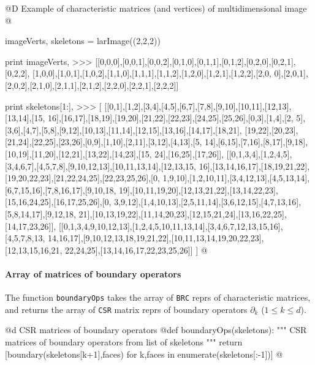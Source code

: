 \documentclass[11pt,oneside]{article}	%
\begin{document}
@D Example of characteristic matrices (and vertices) of multidimensional image
@{imageVerts, skeletons = larImage((2,2,2))

print imageVerts,
>>> [[0,0,0],[0,0,1],[0,0,2],[0,1,0],[0,1,1],[0,1,2],[0,2,0],[0,2,1],[0,2,2],
[1,0,0],[1,0,1],[1,0,2],[1,1,0],[1,1,1],[1,1,2],[1,2,0],[1,2,1],[1,2,2],[2,0,
0],[2,0,1],[2,0,2],[2,1,0],[2,1,1],[2,1,2],[2,2,0],[2,2,1],[2,2,2]]

print skeletons[1:],
>>> [
[[0,1],[1,2],[3,4],[4,5],[6,7],[7,8],[9,10],[10,11],[12,13],[13,14],[15,
16],[16,17],[18,19],[19,20],[21,22],[22,23],[24,25],[25,26],[0,3],[1,4],[2,
5],[3,6],[4,7],[5,8],[9,12],[10,13],[11,14],[12,15],[13,16],[14,17],[18,21],
[19,22],[20,23],[21,24],[22,25],[23,26],[0,9],[1,10],[2,11],[3,12],[4,13],[5,
14],[6,15],[7,16],[8,17],[9,18],[10,19],[11,20],[12,21],[13,22],[14,23],[15,
24],[16,25],[17,26]],
[[0,1,3,4],[1,2,4,5],[3,4,6,7],[4,5,7,8],[9,10,12,13],[10,11,13,14],[12,13,15,
16],[13,14,16,17],[18,19,21,22],[19,20,22,23],[21,22,24,25],[22,23,25,26],[0,
1,9,10],[1,2,10,11],[3,4,12,13],[4,5,13,14],[6,7,15,16],[7,8,16,17],[9,10,18,
19],[10,11,19,20],[12,13,21,22],[13,14,22,23],[15,16,24,25],[16,17,25,26],[0,
3,9,12],[1,4,10,13],[2,5,11,14],[3,6,12,15],[4,7,13,16],[5,8,14,17],[9,12,18,
21],[10,13,19,22],[11,14,20,23],[12,15,21,24],[13,16,22,25],[14,17,23,26]],
[[0,1,3,4,9,10,12,13],[1,2,4,5,10,11,13,14],[3,4,6,7,12,13,15,16],[4,5,7,8,13,
14,16,17],[9,10,12,13,18,19,21,22],[10,11,13,14,19,20,22,23],[12,13,15,16,21,
22,24,25],[13,14,16,17,22,23,25,26]]
]
@}


\paragraph{Array of matrices of boundary operators}

The function \texttt{boundaryOps} takes the array of \texttt{BRC} reprs of characteristic matrices, and returns the array of \texttt{CSR} matrix reprs of boundary operators $\partial_k$ ($1\leq k\leq d$).

@d CSR matrices of boundary operators
@{def boundaryOps(skeletons):
	""" CSR matrices of boundary operators from list of skeletons """
	return [boundary(skeletons[k+1],faces) 
		for k,faces in enumerate(skeletons[:-1])]
@}
\end{document}
